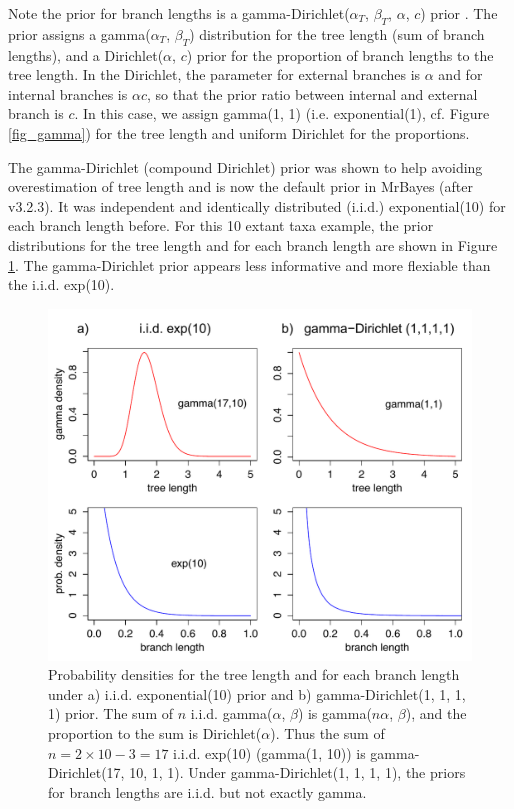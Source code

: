 \documentclass[12pt]{article}
\begin{document}
Note the prior for branch lengths is a gamma-Dirichlet($\alpha_T$, $\beta_T$, $\alpha$, $c$) prior \citep{Rannala:2012ke,Zhang:2012ke}.
The prior assigns a gamma($\alpha_T$, $\beta_T$) distribution for the tree length (sum of branch lengths), and a Dirichlet($\alpha$, $c$) prior for the proportion of branch lengths to the tree length.
In the Dirichlet, the parameter for external branches is $\alpha$ and for internal branches is $\alpha c$, so that the prior ratio between internal and external branch is $c$.
In this case, we assign gamma(1, 1) (i.e. exponential(1), cf. Figure \ref{fig_gamma}) for the tree length and uniform Dirichlet for the proportions.

The gamma-Dirichlet (compound Dirichlet) prior was shown to help avoiding overestimation of tree length \citep{Zhang:2012ke} and is now the default prior in MrBayes (after v3.2.3).
It was independent and identically distributed (i.i.d.) exponential(10) for each branch length before.
For this 10 extant taxa example, the prior distributions for the tree length and for each branch length are shown in Figure \ref{fig_gamdir}.
The gamma-Dirichlet prior appears less informative and more flexiable than the i.i.d. exp(10).

\begin{figure}[p]
\includegraphics[width=1.0\textwidth]{figures/gamdir.pdf}
\caption{Probability densities for the tree length and for each branch length under a) i.i.d. exponential(10) prior and b) gamma-Dirichlet(1, 1, 1, 1) prior.
The sum of $n$ i.i.d. gamma($\alpha$, $\beta$) is gamma($n \alpha$, $\beta$), and the proportion to the sum is Dirichlet($\alpha$).
Thus the sum of $n = 2 \times 10 - 3 = 17$ i.i.d. exp(10) (gamma(1, 10)) is gamma-Dirichlet(17, 10, 1, 1).
Under gamma-Dirichlet(1, 1, 1, 1), the priors for branch lengths are i.i.d. but not exactly gamma.
}
\label{fig_gamdir}
\end{figure}
\clearpage
\end{document}
